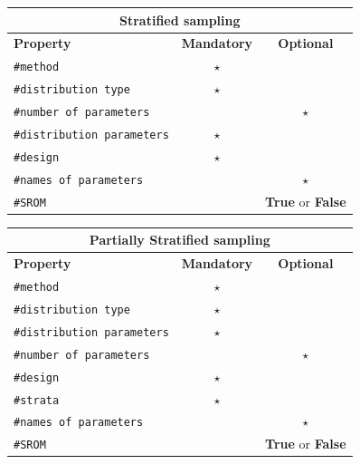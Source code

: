 \documentclass[preprint,12pt]{elsarticle}
\begin{document}
\begin{center}
	\begin{tabular}{ |l|c|c| } 
		\hline
		\multicolumn{3}{|c|}{\textbf{Stratified sampling}} \\
		\hline
		\textbf{Property} & \textbf{Mandatory} & \textbf{Optional} \\
		\hline
		\texttt{\#method}& $\star$ &   \\ 
		\hline
		\texttt{\#distribution type}& $\star$ &   \\ 
		\hline
		\texttt{\#number of parameters}& &$\star$    \\ 
		\hline
		\texttt{\#distribution parameters} & $\star$ &   \\ 
		\hline
		\texttt{\#design}& $\star$ &    \\ 
		\hline
		\texttt{\#names of parameters}& & $\star$   \\ 
		\hline
				\texttt{\#SROM}&  & \textbf{True} or \textbf{False}    \\ 
		\hline
	\end{tabular}
\end{center}

\begin{center}
	\begin{tabular}{ |l|c|c| } 
		\hline
		\multicolumn{3}{|c|}{\textbf{Partially Stratified sampling}} \\
		\hline
		\textbf{Property} & \textbf{Mandatory} & \textbf{Optional} \\
		\hline
		\texttt{\#method}& $\star$ &   \\ 
		\hline
		\texttt{\#distribution type}& $\star$ &   \\ 
		\hline
		\texttt{\#distribution parameters} & $\star$ &   \\ 
		\hline
		\texttt{\#number of parameters}& &$\star$    \\ 
		\hline
		\texttt{\#design}& $\star$  &  \\ 
		\hline
		\texttt{\#strata}& $\star$ &   \\ 
		\hline
		\texttt{\#names of parameters}& & $\star$   \\ 
		\hline
				\texttt{\#SROM}&  & \textbf{True} or \textbf{False}    \\ 
		\hline
	\end{tabular}
\end{center}
\end{document}
